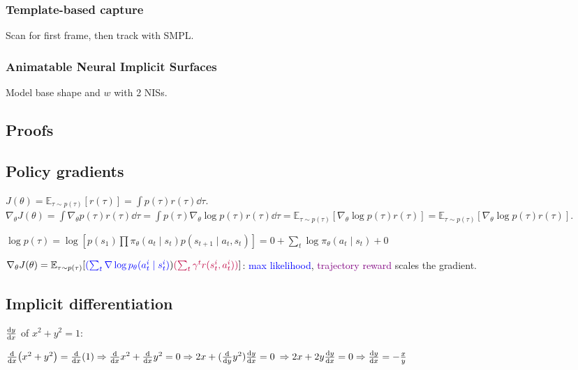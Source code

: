 \documentclass[11pt,landscape,a4paper,fleqn]{article}
\newcommand{\E}{\mathbb{E}}
\begin{document}
\begin{multicols*}{4}
\subsubsection{Template-based capture}
Scan for first frame, then track with SMPL.

\subsubsection{Animatable Neural Implicit Surfaces}

Model base shape and $w$ with 2 NISs.

\end{multicols*}

\begin{multicols*}{3}

\section{Proofs}

\subsection*{Policy gradients}
\quad$J(\theta) = \E_{\tau \sim p(\tau)} [r(\tau)]
= \int p(\tau) r(\tau) \dd \tau$.
$\nabla_\theta J(\theta) = \int \nabla_\theta p(\tau) r(\tau) \dd \tau
= \int p(\tau) \nabla_\theta \log p(\tau) r(\tau) \dd \tau
= \E_{\tau \sim p(\tau)} [\nabla_\theta \log p(\tau) r(\tau)] = \E_{\tau \sim p(\tau)}[\nabla_\theta \log p(\tau) r(\tau)]$.

$\log p(\tau) = \log[p(s_1)\prod \pi_\theta(a_t \mid s_t) p(s_{t+1} \mid a_t, s_t)]
= 0 + \sum_t \log \pi_\theta(a_t \mid s_t) + 0$

$\nabla_\theta J(\theta) = \E_{\tau \sim p(\tau)}
[\textcolor{blue}{(\sum_t \nabla \log p_\theta(a_t^i \mid s_t^i)})\textcolor{purple}{(\sum_t \gamma^t r(s_t^i, a_t^i))}]$:
\textcolor{blue}{max likelihood}, \textcolor{purple}{trajectory reward} scales the gradient.

\subsection*{Implicit differentiation}

$\dv{y}{x}$ of $x^2 + y^2 = 1$:

$\dv{x}(x^2 + y^2) = \dv{x}(1) \Rightarrow \dv{x}x^2 + \dv{x}y^2 = 0 \Rightarrow 2x + (\dv{y} y^2) \dv{y}{x} = 0$
$\Rightarrow 2x + 2y \dv{y}{x} = 0 \Rightarrow \dv{y}{x} =- \frac{x}{y}$


\end{multicols*}
\end{document}
